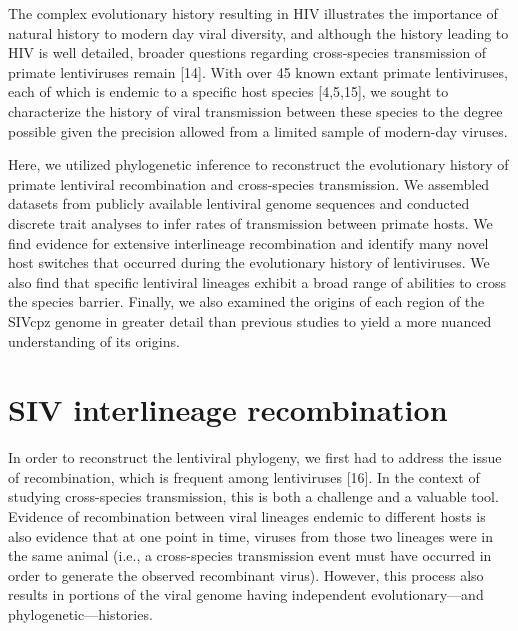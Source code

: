 The complex evolutionary history resulting in HIV illustrates the importance of natural history to modern day viral diversity, and although the history leading to HIV is well detailed, broader questions regarding cross-species transmission of primate lentiviruses remain [14].
With over 45 known extant primate lentiviruses, each of which is endemic to a specific host species [4,5,15], we sought to characterize the history of viral transmission between these species to the degree possible given the precision allowed from a limited sample of modern-day viruses.

Here, we utilized phylogenetic inference to reconstruct the evolutionary history of primate lentiviral recombination and cross-species transmission.
We assembled datasets from publicly available lentiviral genome sequences and conducted discrete trait analyses to infer rates of transmission between primate hosts.
We find evidence for extensive interlineage recombination and identify many novel host switches that occurred during the evolutionary history of lentiviruses.
We also find that specific lentiviral lineages exhibit a broad range of abilities to cross the species barrier.
Finally, we also examined the origins of each region of the SIVcpz genome in greater detail than previous studies to yield a more nuanced understanding of its origins.


\section{SIV interlineage recombination}

In order to reconstruct the lentiviral phylogeny, we first had to address the issue of recombination, which is frequent among lentiviruses [16].
In the context of studying cross-species transmission, this is both a challenge and a valuable tool.
Evidence of recombination between viral lineages endemic to different hosts is also evidence that at one point in time, viruses from those two lineages were in the same animal (i.e., a cross-species transmission event must have occurred in order to generate the observed recombinant virus).
However, this process also results in portions of the viral genome having independent evolutionary—and phylogenetic—histories.

